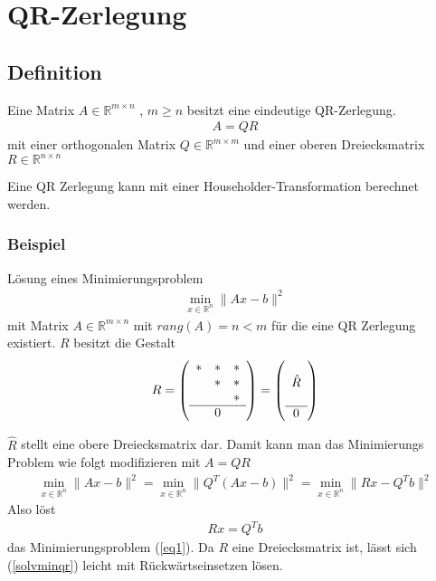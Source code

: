 \chapter{QR-Zerlegung}

\section{Definition}
Eine Matrix $A \in \mathbb{R}^{m \times n}$ , $m \ge n$ besitzt eine eindeutige QR-Zerlegung.
\begin{align}
	A = QR
\end{align}
mit einer orthogonalen Matrix $ Q \in \mathbb{R}^{m \times m} $ und einer oberen Dreiecksmatrix $ R \in \mathbb{R}^{n \times n}$ \cite{num1}

Eine QR Zerlegung kann mit einer Householder-Transformation berechnet werden.

\subsection{Beispiel}
Lösung eines Minimierungsproblem
\begin{align}
	\min_{x \in \mathbb{R}^n} \|Ax-b\|^2 \label{eq1}
\end{align}
mit Matrix $A \in \mathbb{R}^{m\times n}$ mit $rang(A) = n < m$ für die eine QR Zerlegung existiert.
$R$ besitzt die Gestalt 
\begin{align*}
	R=	
	\left(\begin{array}{ccc}
		*&*&* \\ 
		&*&* \\ 
		& &* \\ \hline
		& 0 &
	\end{array} \right)
	=
	\left(\begin{array}{c}
	 \\ 
	\hat{R} \\ 
	 \\ \hline
	0
	\end{array} \right) 
\end{align*}

$\hat{R}$ stellt eine obere Dreiecksmatrix dar.
Damit kann man das Minimierungs Problem wie folgt modifizieren mit $A=QR$
\begin{align}
		\min_{x \in \mathbb{R}^n} \|Ax-b\|^2 =
		\min_{x \in \mathbb{R}^n} \|Q^T(Ax-b)\|^2 =
		\min_{x \in \mathbb{R}^n} \|Rx-Q^Tb\|^2
\end{align}
Also löst
\begin{align}
Rx=Q^Tb \label{solvminqr}
\end{align}
das Minimierungsproblem (\ref{eq1}). Da $R$ eine Dreiecksmatrix ist, lässt sich (\ref{solvminqr}) leicht mit Rückwärtseinsetzen  lösen.

